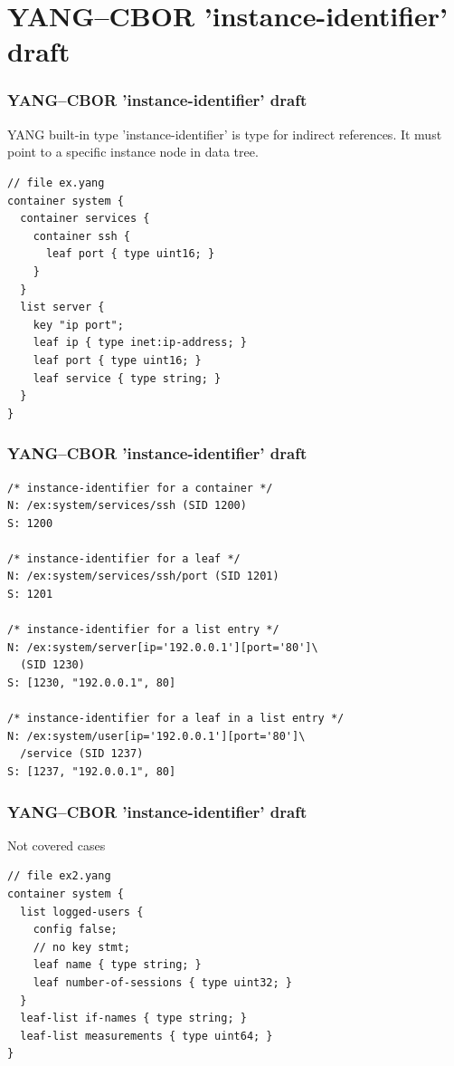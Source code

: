 \documentclass{beamer}
\begin{document}
\section{YANG--CBOR 'instance-identifier' draft}
\begin{frame}[fragile]
	\frametitle{YANG--CBOR 'instance-identifier' draft}
	YANG built-in type 'instance-identifier' is type for indirect references.
	It must point to a specific instance node in data tree.

\begin{verbatim}
// file ex.yang
container system {
  container services {
    container ssh {
      leaf port { type uint16; }
    }
  }
  list server {
    key "ip port";
    leaf ip { type inet:ip-address; }
    leaf port { type uint16; }
    leaf service { type string; }
  }
}
\end{verbatim}
\end{frame}

\begin{frame}[fragile]

	\frametitle{YANG--CBOR 'instance-identifier' draft}
\begin{verbatim}
/* instance-identifier for a container */
N: /ex:system/services/ssh (SID 1200)
S: 1200

/* instance-identifier for a leaf */
N: /ex:system/services/ssh/port (SID 1201)
S: 1201

/* instance-identifier for a list entry */
N: /ex:system/server[ip='192.0.0.1'][port='80']\
  (SID 1230)
S: [1230, "192.0.0.1", 80]

/* instance-identifier for a leaf in a list entry */
N: /ex:system/user[ip='192.0.0.1'][port='80']\
  /service (SID 1237)
S: [1237, "192.0.0.1", 80]
\end{verbatim}
\end{frame}

\begin{frame}[fragile]
	\frametitle{YANG--CBOR 'instance-identifier' draft}
	Not covered cases
\begin{verbatim}
// file ex2.yang
container system {
  list logged-users {
    config false;
    // no key stmt;
    leaf name { type string; }
    leaf number-of-sessions { type uint32; }
  }
  leaf-list if-names { type string; }
  leaf-list measurements { type uint64; }
}
\end{verbatim}
\end{frame}
\end{document}
